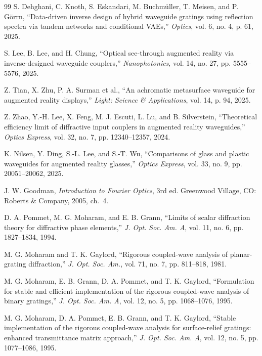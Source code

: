 \documentclass[10pt,twocolumn]{article}
\begin{document}
\begin{thebibliography}{99}
 S. Dehghani, C. Knoth, S. Eskandari, M. Buchm{\"u}ller, T. Meisen, and P. G{\"o}rrn, ``Data-driven inverse design of hybrid waveguide gratings using reflection spectra via tandem networks and conditional VAEs,'' \emph{Optics}, vol. 6, no. 4, p. 61, 2025.

 S. Lee, B. Lee, and H. Chung, ``Optical see-through augmented reality via inverse-designed waveguide couplers,'' \emph{Nanophotonics}, vol. 14, no. 27, pp. 5555--5576, 2025.

 Z. Tian, X. Zhu, P. A. Surman et al., ``An achromatic metasurface waveguide for augmented reality displays,'' \emph{Light: Science \& Applications}, vol. 14, p. 94, 2025.

 Z. Zhao, Y.-H. Lee, X. Feng, M. J. Escuti, L. Lu, and B. Silverstein, ``Theoretical efficiency limit of diffractive input couplers in augmented reality waveguides,'' \emph{Optics Express}, vol. 32, no. 7, pp. 12340--12357, 2024.

 K. Nilsen, Y. Ding, S.-L. Lee, and S.-T. Wu, ``Comparisons of glass and plastic waveguides for augmented reality glasses,'' \emph{Optics Express}, vol. 33, no. 9, pp. 20051--20062, 2025.

 J. W. Goodman, \emph{Introduction to Fourier Optics}, 3rd ed. Greenwood Village, CO: Roberts \& Company, 2005, ch.~4.

 D. A. Pommet, M. G. Moharam, and E. B. Grann, ``Limits of scalar diffraction theory for diffractive phase elements,'' \emph{J. Opt. Soc. Am. A}, vol. 11, no. 6, pp. 1827--1834, 1994.

 M. G. Moharam and T. K. Gaylord, ``Rigorous coupled-wave analysis of planar-grating diffraction,'' \emph{J. Opt. Soc. Am.}, vol. 71, no. 7, pp. 811--818, 1981.

 M. G. Moharam, E. B. Grann, D. A. Pommet, and T. K. Gaylord, ``Formulation for stable and efficient implementation of the rigorous coupled-wave analysis of binary gratings,'' \emph{J. Opt. Soc. Am. A}, vol. 12, no. 5, pp. 1068--1076, 1995.

 M. G. Moharam, D. A. Pommet, E. B. Grann, and T. K. Gaylord, ``Stable implementation of the rigorous coupled-wave analysis for surface-relief gratings: enhanced transmittance matrix approach,'' \emph{J. Opt. Soc. Am. A}, vol. 12, no. 5, pp. 1077--1086, 1995.


\end{thebibliography}
\end{document}
